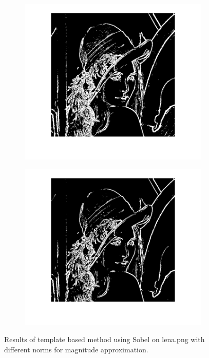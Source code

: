 \documentclass{article}
\begin{document}
\begin{figure}
        \centering
        \begin{subfigure}[b]{0.49\textwidth}
            \includegraphics[width=\textwidth]{Images/lena_sobel_l1.png}
        \end{subfigure}
        \begin{subfigure}[b]{0.49\textwidth}
            \includegraphics[width=\textwidth]{Images/lena_sobel_l2.png}
        \end{subfigure}
        \caption{Results of template based method using Sobel on \textsf{lena.png} with different norms for magnitude approximation.}
        \label{fig:temp_sobel_lena}
\end{figure}
\end{document}
